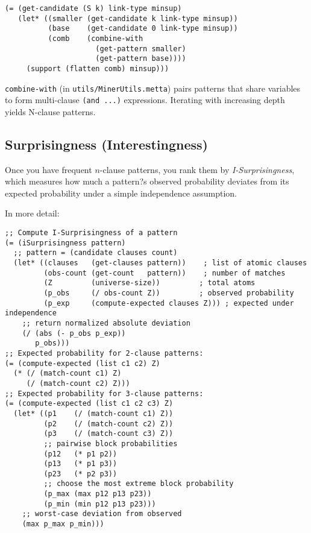 \documentclass{article}
\begin{document}
\begin{verbatim}
(= (get-candidate (S k) link-type minsup)
   (let* ((smaller (get-candidate k link-type minsup))
          (base    (get-candidate 0 link-type minsup))
          (comb    (combine-with
                     (get-pattern smaller)
                     (get-pattern base))))
     (support (flatten comb) minsup)))
\end{verbatim}

\texttt{combine-with} (in \texttt{utils/MinerUtils.metta}) pairs patterns that share variables to form multi-clause \verb|(and ...)| expressions.  Iterating with increasing depth yields N-clause patterns.

\subsection{Surprisingness (Interestingness)}

Once you have frequent $n$-clause patterns, you rank them by \emph{I-Surprisingness}, which measures how much a pattern?s observed probability deviates from its expected probability under a simple independence assumption.  

In more detail:

\begin{verbatim}
;; Compute I-Surprisingness of a pattern
(= (iSurprisingness pattern)
  ;; pattern = (candidate clauses count)
  (let* ((clauses   (get-clauses pattern))    ; list of atomic clauses
         (obs-count (get-count   pattern))    ; number of matches
         (Z         (universe-size))         ; total atoms
         (p_obs     (/ obs-count Z))         ; observed probability
         (p_exp     (compute-expected clauses Z))) ; expected under independence
    ;; return normalized absolute deviation
    (/ (abs (- p_obs p_exp))
       p_obs)))
;; Expected probability for 2-clause patterns:
(= (compute-expected (list c1 c2) Z)
  (* (/ (match-count c1) Z)
     (/ (match-count c2) Z)))
;; Expected probability for 3-clause patterns:
(= (compute-expected (list c1 c2 c3) Z)
  (let* ((p1    (/ (match-count c1) Z))
         (p2    (/ (match-count c2) Z))
         (p3    (/ (match-count c3) Z))
         ;; pairwise block probabilities
         (p12   (* p1 p2))
         (p13   (* p1 p3))
         (p23   (* p2 p3))
         ;; choose the most extreme block probability
         (p_max (max p12 p13 p23))
         (p_min (min p12 p13 p23)))
    ;; worst-case deviation from observed
    (max p_max p_min)))
\end{verbatim}
\end{document}
